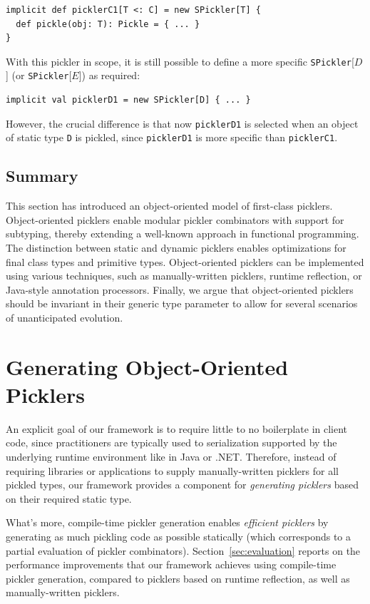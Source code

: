 \documentclass[preprint,10pt]{sigplanconf}
\theoremstyle{definition}
\theoremstyle{definition}
\newcommand{\term}[1]{\mbox{\texttt{#1}}}
\begin{document}
\begin{lstlisting}
implicit def picklerC1[T <: C] = new SPickler[T] {
  def pickle(obj: T): Pickle = { ... }
}
\end{lstlisting}

With this pickler in scope, it is still possible to define a more specific
\term{SPickler}[$D$] (or \term{SPickler}[$E$]) as required:

\begin{lstlisting}
implicit val picklerD1 = new SPickler[D] { ... }
\end{lstlisting}

However, the crucial difference is that now \term{picklerD1} is selected when
an object of static type \term{D} is pickled, since \term{picklerD1} is more
specific than \term{picklerC1}.

\subsection{Summary}

This section has introduced an object-oriented model of first-class picklers.
Object-oriented picklers enable modular pickler combinators with support for
subtyping, thereby extending a well-known approach in functional programming.
The distinction between static and dynamic picklers enables optimizations for
final class types and primitive types. Object-oriented picklers can be
implemented using various techniques, such as manually-written picklers,
runtime reflection, or Java-style annotation processors. Finally, we argue
that object-oriented picklers should be invariant in their generic type
parameter to allow for several scenarios of unanticipated evolution.


\section{Generating Object-Oriented Picklers}
\label{sec:generation}

An explicit goal of our framework is to require little to no boilerplate in
client code, since practitioners are typically used to serialization supported
by the underlying runtime environment like in Java or .NET. Therefore, instead
of requiring libraries or applications to supply manually-written picklers for
all pickled types, our framework provides a component for {\em generating
picklers} based on their required static type.

What's more, compile-time pickler generation enables {\em efficient picklers}
by generating as much pickling code as possible statically (which corresponds
to a partial evaluation of pickler combinators). Section~\ref{sec:evaluation}
reports on the performance improvements that our framework achieves using
compile-time pickler generation, compared to picklers based on runtime
reflection, as well as manually-written picklers.
\end{document}
